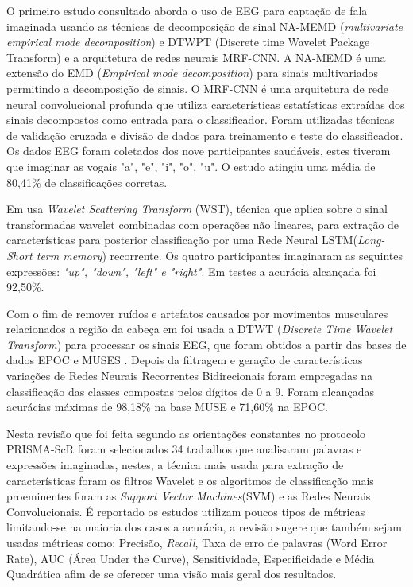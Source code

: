 			\par O primeiro estudo consultado \cite{ParkHyeong-jun2023Mcoi} aborda o uso de EEG para captação de fala imaginada usando as técnicas de decomposição de sinal NA-MEMD (\textit{multivariate empirical mode decomposition}) e DTWPT (Discrete time Wavelet Package Transform) e a arquitetura de redes neurais MRF-CNN. A NA-MEMD é uma extensão do EMD (\textit{Empirical mode decomposition}) para sinais multivariados permitindo a decomposição de sinais. O MRF-CNN é uma arquitetura de rede neural convolucional profunda que utiliza características estatísticas extraídas dos sinais decompostos como entrada para o classificador. Foram utilizadas técnicas de validação cruzada e divisão de dados para treinamento e teste do classificador. Os dados EEG foram coletados dos nove participantes saudáveis, estes tiveram que imaginar as vogais "a", "e", "i", "o", "u". O estudo atingiu uma média de 80,41\% de classificações corretas.
			
			\par Em \cite{AbdulghaniMokhlesM2023ISCU} usa \textit{Wavelet Scattering Transform} (WST), técnica que aplica sobre o sinal transformadas wavelet combinadas com operações não lineares, para extração de características para posterior classificação por uma Rede Neural LSTM(\textit{Long-Short term memory}) recorrente. Os quatro participantes imaginaram as seguintes expressões: \textit{"up", "down", "left" e "right"}. Em testes a acurácia alcançada foi 92,50\%.
			
			\par Com o fim de remover ruídos e artefatos causados por movimentos musculares relacionados a região da cabeça em \cite{MahapatraNrushinghCharan2023Ecoi} foi usada a DTWT (\textit{Discrete Time Wavelet Transform}) para processar os sinais EEG, que foram obtidos a partir das bases de dados EPOC e MUSES \cite{mindbigdata}. Depois da filtragem e geração de características variações de Redes Neurais Recorrentes Bidirecionais foram empregadas na classificação das classes compostas pelos dígitos de 0 a 9. Foram alcançadas acurácias máximas de 98,18\% na base MUSE e 71,60\% na EPOC.
			
			\par Nesta revisão \cite{ShahUzair2022TRoA} que foi feita segundo as orientações constantes no protocolo PRISMA-ScR foram selecionados 34 trabalhos que analisaram palavras e expressões imaginadas, nestes, a técnica mais usada para extração de características foram os filtros Wavelet e os algoritmos de classificação mais proeminentes foram as \textit{Support Vector Machines}(SVM) e as Redes Neurais Convolucionais. É reportado os estudos utilizam poucos tipos de métricas limitando-se na maioria dos casos a acurácia, a revisão sugere que também sejam usadas métricas como: Precisão, \textit{Recall}, Taxa de erro de palavras (Word Error Rate), AUC (Área Under the Curve), Sensitividade, Especificidade e Média Quadrática afim de se oferecer uma visão mais geral dos resultados. 
			
